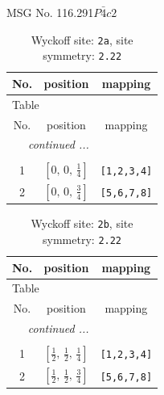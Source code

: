 \documentclass[fleqn,8pt]{jsarticle}
\begin{document}
\setcounter{MaxMatrixCols}{32}

\renewcommand{\tablename}{Table~}
\renewcommand{\figurename}{Figure~}
\begin{center}
\LARGE
MSG No. 116.291\quad$P\bar{4}c2$
\end{center}
\renewcommand{\arraystretch}{1.2}
\begin{longtable}{ccc}
\caption{Wyckoff site: {\tt 2a}, site symmetry: {\tt 2.22}}
 \\
 \hline \hline
No. & position & mapping \\ \hline \endfirsthead

\multicolumn{2}{l}{\tablename\ \thetable{}} \\
 \hline \hline
No. & position & mapping \\ \hline \endhead

 \hline \hline
\multicolumn{2}{r}{\footnotesize\it continued ...} \\ \endfoot

 \hline \hline
\multicolumn{2}{r}{} \\ \endlastfoot

1 & $\left[ 0,\, 0,\, \frac{1}{4} \right]$ & {\tt [1,2,3,4]} \\ \hline
2 & $\left[ 0,\, 0,\, \frac{3}{4} \right]$ & {\tt [5,6,7,8]} \\
\end{longtable}
\renewcommand{\arraystretch}{1.2}
\begin{longtable}{ccc}
\caption{Wyckoff site: {\tt 2b}, site symmetry: {\tt 2.22}}
 \\
 \hline \hline
No. & position & mapping \\ \hline \endfirsthead

\multicolumn{2}{l}{\tablename\ \thetable{}} \\
 \hline \hline
No. & position & mapping \\ \hline \endhead

 \hline \hline
\multicolumn{2}{r}{\footnotesize\it continued ...} \\ \endfoot

 \hline \hline
\multicolumn{2}{r}{} \\ \endlastfoot

1 & $\left[ \frac{1}{2},\, \frac{1}{2},\, \frac{1}{4} \right]$ & {\tt [1,2,3,4]} \\ \hline
2 & $\left[ \frac{1}{2},\, \frac{1}{2},\, \frac{3}{4} \right]$ & {\tt [5,6,7,8]} \\
\end{longtable}
\end{document}
